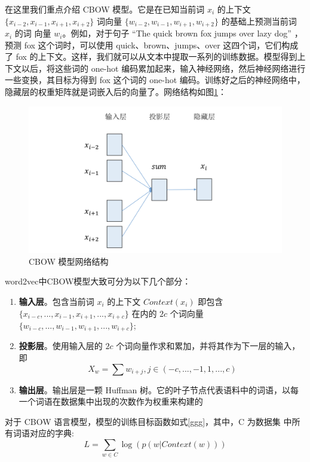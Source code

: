 在这里我们重点介绍 CBOW 模型。它是在已知当前词 $x_i$ 的上下文 $\{x_{i−2}, x_{i−1}, x_{i+1}, x_{i+2}\}$ 词向量 $\{w_{i−2}, w_{i−1}, w_{i+1}, w_{i+2}\}$ 的基础上预测当前词 $x_i$ 的词 向量 $w_i$。例如，对于句子 “The quick brown fox jumps over lazy dog” ，预测 fox 这个词时，可以使用 quick、brown、jumps、over 这四个词，它们构成了 fox 的上下文。这样，我们就可以从文本中提取一系列的训练数据。模型得到上下文以后，将这些词的 one-hot 编码累加起来，输入神经网络，然后神经网络进行一些变换，其目标为得到 fox 这个词的 one-hot 编码。训练好之后的神经网络中，隐藏层的权重矩阵就是词嵌入后的向量了。网络结构如图\ref{fig:CBOW}：
\begin{figure}[ht]
    \centering
    \includegraphics[width=\linewidth]{figures/CBOW.png}
    \caption{CBOW 模型网络结构}
    \label{fig:CBOW}
\end{figure}

word2vec中CBOW模型大致可分为以下几个部分：
\begin{enumerate}
	\item \textbf{输入层}。包含当前词 $x_i$ 的上下文 $Context(x_i)$ 即包含 $\{x_{i−c},..., x_{i−1}, x_{i+1},..., x_{i+c}\}$ 在内的 $2c$ 个词向量 $\{w_{i−c},..., w_{i−1}, w_{i+1},...,w_{i+c}\}$;
	\item \textbf{投影层}。使用输入层的 $2c$ 个词向量作求和累加，并将其作为下一层的输入，即
		\begin{equation}
			X_{w} = \sum w_{i+j}, j \in (-c,...,-1,1,...,c)
		\end{equation}
	\item \textbf{输出层}。输出层是一颗 Huffman 树。它的叶子节点代表语料中的词语，以每一个词语在数据集中出现的次数作为权重来构建的
\end{enumerate}
对于 CBOW 语言模型，模型的训练目标函数如式\ref{ggg}，其中，C 为数据集
中所有词语对应的字典:
	\begin{equation}
		L=\sum_{w \in C} \log (p(w | Context(w)))
	\label{ggg}
	\end{equation}
	
